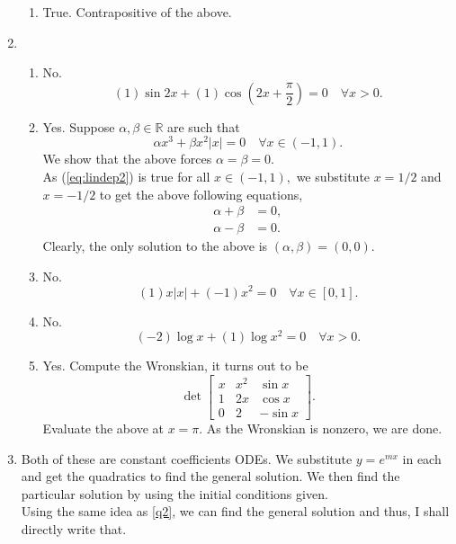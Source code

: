 \documentclass[12pt]{article}
\theoremstyle{definition}
\numberwithin{thm}{section}
\begin{document}
\begin{enumerate}[leftmargin=*, label = Q.\arabic*.]
\begin{enumerate}[label = (\roman*)]
		\item True. Contrapositive of the above.
	\end{enumerate}
	\item 
	\begin{enumerate}[label = (\roman*)] 
		\item No.
		\begin{equation*} 
			(1)\sin2x + (1)\cos\left(2x + \frac{\pi}{2}\right) = 0 \quad \forall x > 0.
		\end{equation*}
		\item Yes. Suppose $\alpha, \beta \in \mathbb{R}$ are such that
		\begin{equation} \label{eq:lindep2} 
			\alpha x^3 + \beta x^2|x| = 0 \quad \forall x \in (-1, 1).
		\end{equation}
		We show that the above forces $\alpha = \beta = 0.$\\
		As (\ref{eq:lindep2}) is true for all $x \in (-1, 1),$ we substitute $x = 1/2$ and $x = -1/2$ to get the above following equations,
		\begin{align*} 
			\alpha + \beta &= 0,\\
			\alpha - \beta &= 0.
		\end{align*}
		Clearly, the only solution to the above is $(\alpha, \beta) = (0, 0).$
		\item No.
		\begin{equation*} 
			(1)x|x| + (-1)x^2 = 0 \quad \forall x \in [0, 1].
		\end{equation*}
		\item No.
		\begin{equation*} 
			(-2)\log x + (1)\log x^2 = 0 \quad \forall x > 0.
		\end{equation*}
		\item Yes. Compute the Wronskian, it turns out to be
		\[\det\begin{bmatrix}
			x & x^2 & \sin x\\
			1 & 2x & \cos x\\
			0 & 2 & -\sin x
		\end{bmatrix}.\]
		Evaluate the above at $x = \pi.$ As the Wronskian is nonzero, we are done.
	\end{enumerate}
	\item Both of these are constant coefficients ODEs. We substitute $y = e^{mx}$ in each and get the quadratics to find the general solution. We then find the particular solution by using the initial conditions given.\\
	Using the same idea as \ref{q2}, we can find the general solution and thus, I shall directly write that.

\end{enumerate}
\end{document}
